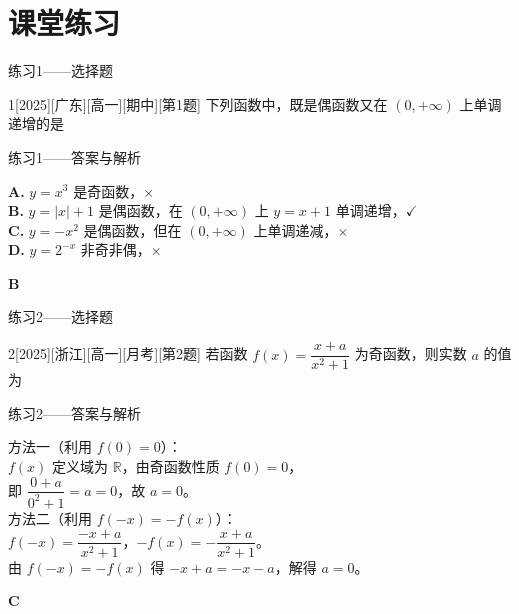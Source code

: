 \section{课堂练习}

\begin{frame}{练习1——选择题}
	\begin{exercise}{1}[2025][广东][高一][期中][第1题]
		下列函数中，既是偶函数又在 $(0,+\infty)$ 上单调递增的是
		\begin{choices}
		\end{choices}	
	\end{exercise}
	
\end{frame}

\begin{frame}{练习1——答案与解析}
	\begin{solutions}
		\textbf{A.} $y=x^3$ 是奇函数，$\times$\\
		\textbf{B.} $y=|x|+1$ 是偶函数，在 $(0,+\infty)$ 上 $y=x+1$ 单调递增，$\checkmark$\\
		\textbf{C.} $y=-x^2$ 是偶函数，但在 $(0,+\infty)$ 上单调递减，$\times$\\
		\textbf{D.} $y=2^{-x}$ 非奇非偶，$\times$
	\end{solutions}
	\begin{answer}
		\textbf{B}
	\end{answer}
\end{frame}

\begin{frame}{练习2——选择题}
	\begin{exercise}{2}[2025][浙江][高一][月考][第2题]
		若函数 $f(x)=\dfrac{x+a}{x^2+1}$ 为奇函数，则实数 $a$ 的值为
	\end{exercise}
	\begin{choices}
		\choice{$1$}
		\choice{$-1$}
		\choice{$0$}
		\choice{$2$}
	\end{choices}
\end{frame}

\begin{frame}{练习2——答案与解析}
	\begin{solutions}
		方法一（利用 $f(0)=0$）：\\
		$f(x)$ 定义域为 $\mathbb{R}$，由奇函数性质 $f(0)=0$，\\
		即 $\dfrac{0+a}{0^2+1}=a=0$，故 $a=0$。\\[3mm]
		方法二（利用 $f(-x)=-f(x)$）：\\
		$f(-x)=\dfrac{-x+a}{x^2+1}$，$-f(x)=-\dfrac{x+a}{x^2+1}$。\\
		由 $f(-x)=-f(x)$ 得 $-x+a=-x-a$，解得 $a=0$。
	\end{solutions}
	\begin{answer}
		\textbf{C}
	\end{answer}
\end{frame}


